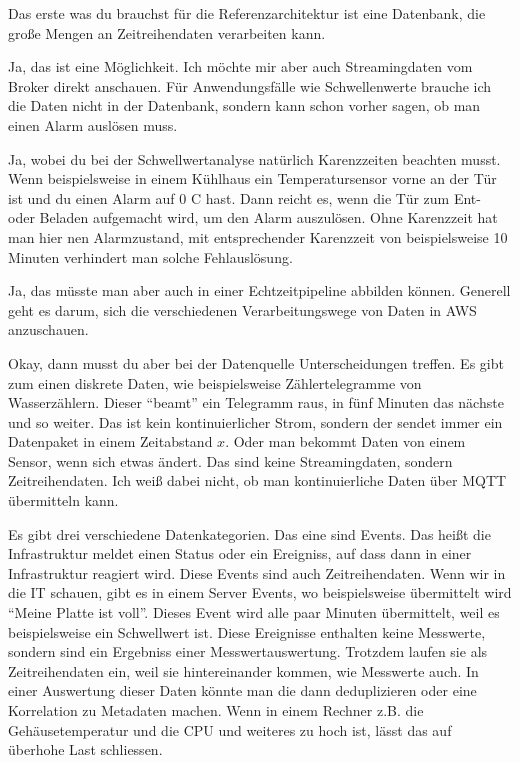 \PE Das erste was du brauchst für die Referenzarchitektur ist eine Datenbank, die große Mengen an Zeitreihendaten verarbeiten kann.

\LF Ja, das ist eine Möglichkeit. Ich möchte mir aber auch Streamingdaten vom Broker direkt anschauen. Für Anwendungsfälle wie Schwellenwerte brauche ich die Daten nicht in der Datenbank, sondern kann schon vorher sagen, ob man einen Alarm auslösen muss.

\PE Ja, wobei du bei der Schwellwertanalyse natürlich Karenzzeiten beachten musst. Wenn beispielsweise in einem Kühlhaus ein Temperatursensor vorne an der Tür ist und du einen Alarm auf 0 \textdegree{}C hast. Dann reicht es, wenn die Tür zum Ent- oder Beladen aufgemacht wird, um den Alarm auszulösen. Ohne Karenzzeit hat man hier nen Alarmzustand, mit entsprechender Karenzzeit von beispielsweise 10 Minuten verhindert man solche Fehlauslösung.

\LF Ja, das müsste man aber auch in einer Echtzeitpipeline abbilden können. Generell geht es darum, sich die verschiedenen Verarbeitungswege von Daten in \ac{AWS} anzuschauen. 

\PE Okay, dann musst du aber bei der Datenquelle Unterscheidungen treffen. Es gibt zum einen diskrete Daten, wie beispielsweise Zählertelegramme von Wasserzählern. Dieser \enquote{beamt} ein Telegramm raus, in fünf Minuten das nächste und so weiter. Das ist kein kontinuierlicher Strom, sondern der sendet immer ein Datenpaket in einem Zeitabstand $x$. Oder man bekommt Daten von einem Sensor, wenn sich etwas ändert. Das sind keine Streamingdaten, sondern Zeitreihendaten. Ich weiß dabei nicht, ob man kontinuierliche Daten über \ac{MQTT} übermitteln kann.

Es gibt drei verschiedene Datenkategorien. Das eine sind Events. Das heißt die Infrastruktur meldet einen Status oder ein Ereigniss, auf dass dann in einer Infrastruktur reagiert wird. Diese Events sind auch Zeitreihendaten. Wenn wir in die IT schauen, gibt es in einem Server Events, wo beispielsweise übermittelt wird \enquote{Meine Platte ist voll}. Dieses Event wird alle paar Minuten übermittelt, weil es beispielsweise ein Schwellwert ist. Diese Ereignisse enthalten keine Messwerte, sondern sind ein Ergebniss einer Messwertauswertung. Trotzdem laufen sie als Zeitreihendaten ein, weil sie hintereinander kommen, wie Messwerte auch. In einer Auswertung dieser Daten könnte man die dann deduplizieren oder eine Korrelation zu Metadaten machen. Wenn in einem Rechner z.B. die Gehäusetemperatur und die CPU und weiteres zu hoch ist, lässt das auf überhohe Last schliessen. 

